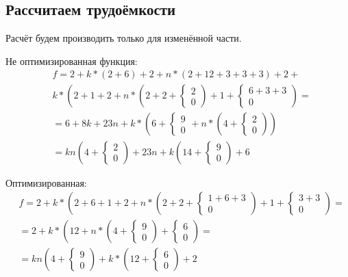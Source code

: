 \subsection{Рассчитаем трудоёмкости}
\label{subsec:hard}
Расчёт будем производить только для изменённой части.
\par Не оптимизированная функция:
\begin{equation}
\begin{split}
	&f=2+k*(2+6)+2+n*(2+12+3+3+3)+2+\\
	&k*(2+1+2+n*(2+2+\begin{cases}
		2\\0
	\end{cases})+1+\begin{cases}
	6+3+3\\0
	\end{cases})=\\
	&=6+8k+23n+k*(6+\begin{cases}
		9\\0
	\end{cases}+n*(4+\begin{cases}
	2\\0
	\end{cases}))\\
	&=kn(4+\begin{cases}2\\0\end{cases})+23n+k(14+\begin{cases} 9\\0\end{cases})+6
\end{split}
\end{equation}
\par Оптимизированная:
\begin{equation}
\begin{split}
	&f=2+k*(2+6+1+2+n*(2+2+\begin{cases}1+6+3\\0\end{cases})+1+\begin{cases}3+3\\0\end{cases})=\\
	&=2+k*(12+n*(4+\begin{cases}9\\0\end{cases})+\begin{cases}6\\0\end{cases})=\\
	&=kn(4+\begin{cases}9\\0\end{cases})+k*(12+\begin{cases}6\\0\end{cases})+2
\end{split}
\end{equation}
